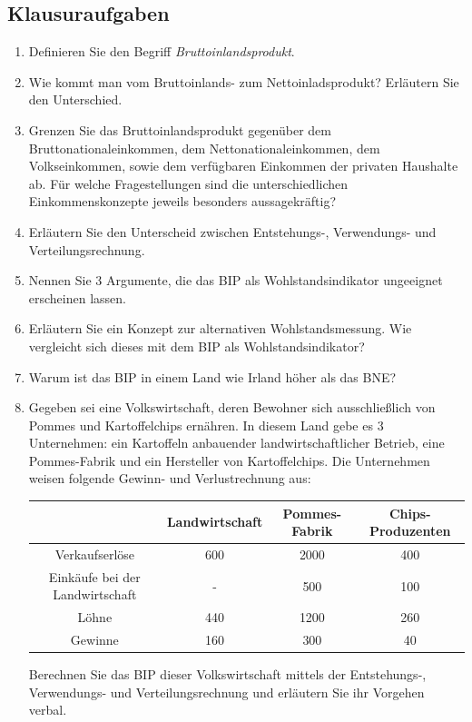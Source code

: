 \documentclass{scrartcl}
\begin{document}
\subsection{Klausuraufgaben}
\begin{enumerate}
  \item Definieren Sie den Begriff \emph{Bruttoinlandsprodukt}.
  \item Wie kommt man vom Bruttoinlands- zum Nettoinladsprodukt? Erl\"{a}utern Sie den Unterschied.
  \item Grenzen Sie das Bruttoinlandsprodukt gegen\"{u}ber dem Bruttonationaleinkommen, dem Nettonationaleinkommen, dem Volkseinkommen, sowie dem verf\"{u}gbaren Einkommen der privaten Haushalte ab. F\"{u}r welche Fragestellungen sind die unterschiedlichen Einkommenskonzepte jeweils besonders aussagekr\"{a}ftig?
  \item Erl\"{a}utern Sie den Unterscheid zwischen Entstehungs-, Verwendungs- und Verteilungsrechnung.
  \item Nennen Sie 3 Argumente, die das BIP als Wohlstandsindikator ungeeignet erscheinen lassen.
  \item Erl\"{a}utern Sie ein Konzept zur alternativen Wohlstandsmessung. Wie vergleicht sich dieses mit dem BIP als Wohlstandsindikator?
  \item Warum ist das BIP in einem Land wie Irland höher als das BNE?
  \item Gegeben sei eine Volkswirtschaft, deren Bewohner sich ausschließlich von Pommes und Kartoffelchips ernähren. In diesem Land gebe es 3 Unternehmen: ein Kartoffeln anbauender landwirtschaftlicher Betrieb, eine Pommes-Fabrik und ein Hersteller von Kartoffelchips. Die Unternehmen weisen folgende Gewinn- und Verlustrechnung aus:
  \begin{center}
  \begin{tabular}{|c|c|c|c|}
  	\hline 
  	&Landwirtschaft  &Pommes-Fabrik  &Chips-Produzenten  \\ 
  	\hline 
  	Verkaufserlöse&600  & 2000  & 400 \\ 
  	\hline 
  	Einkäufe bei der Landwirtschaft& -  &500  & 100 \\ 
  	\hline 
  	Löhne& 440 & 1200  & 260  \\ 
  	\hline 
  	Gewinne &160  &300  &40  \\ 
  	\hline 
  \end{tabular}\end{center}
\noindent Berechnen Sie das BIP dieser Volkswirtschaft mittels der Entstehungs-, Verwendungs- und Verteilungsrechnung und erläutern Sie ihr Vorgehen verbal. 
\end{enumerate}
\newpage
\end{document}
